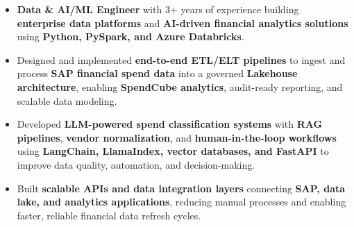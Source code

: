 
\noindent
\begin{minipage}{\textwidth}
\normalsize
\vspace{0.5em}
\begin{itemize}
    \setlength{\itemsep}{0.7pt}
    \setlength{\parskip}{0pt}
    \setlength{\labelsep}{0.3em} 
    
    \item \textbf{Data \& AI/ML Engineer} with 3+ years of experience building \textbf{enterprise data platforms} and \textbf{AI-driven financial analytics solutions} using \textbf{Python, PySpark, and Azure Databricks}.
    \item Designed and implemented \textbf{end-to-end ETL/ELT pipelines} to ingest and process \textbf{SAP financial spend data} into a governed \textbf{Lakehouse architecture}, enabling \textbf{SpendCube analytics}, audit-ready reporting, and scalable data modeling.
    \item Developed \textbf{LLM-powered spend classification systems} with \textbf{RAG pipelines}, \textbf{vendor normalization}, and \textbf{human-in-the-loop workflows} using \textbf{LangChain, LlamaIndex, vector databases, and FastAPI} to improve data quality, automation, and decision-making.
    \item Built \textbf{scalable APIs and data integration layers} connecting \textbf{SAP, data lake, and analytics applications}, reducing manual processes and enabling faster, reliable financial data refresh cycles.

\end{itemize}
\end{minipage}
\vspace{0.1em}

